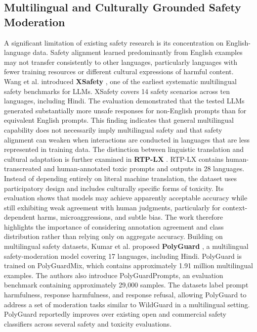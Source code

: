 \documentclass[11pt,a4paper]{article}
\begin{document}
\subsection{Multilingual and Culturally Grounded Safety Moderation}
A significant limitation of existing safety research is its concentration on English-language data. Safety alignment learned predominantly from English examples may not transfer consistently to other languages, particularly languages with fewer training resources or different cultural expressions of harmful content.
Wang et al. introduced \textbf{XSafety} \cite{wang2024languages}, one of the earliest systematic multilingual safety benchmarks for LLMs. XSafety covers 14 safety scenarios across ten languages, including Hindi. The evaluation demonstrated that the tested LLMs generated substantially more unsafe responses for non-English prompts than for equivalent English prompts. This finding indicates that general multilingual capability does not necessarily imply multilingual safety and that safety alignment can weaken when interactions are conducted in languages that are less represented in training data.
The distinction between linguistic translation and cultural adaptation is further examined in \textbf{RTP-LX} \cite{dewynter2024rtplx}. RTP-LX contains human-transcreated and human-annotated toxic prompts and outputs in 28 languages. Instead of depending entirely on literal machine translation, the dataset uses participatory design and includes culturally specific forms of toxicity. Its evaluation shows that models may achieve apparently acceptable accuracy while still exhibiting weak agreement with human judgments, particularly for context-dependent harms, microaggressions, and subtle bias. The work therefore highlights the importance of considering annotation agreement and class distribution rather than relying only on aggregate accuracy.
Building on multilingual safety datasets, Kumar et al. proposed \textbf{PolyGuard} \cite{kumar2025polyguard}, a multilingual safety-moderation model covering 17 languages, including Hindi. PolyGuard is trained on PolyGuardMix, which contains approximately 1.91 million multilingual examples. The authors also introduce PolyGuardPrompts, an evaluation benchmark containing approximately 29,000 samples. The datasets label prompt harmfulness, response harmfulness, and response refusal, allowing PolyGuard to address a set of moderation tasks similar to WildGuard in a multilingual setting. PolyGuard reportedly improves over existing open and commercial safety classifiers across several safety and toxicity evaluations.
\end{document}
